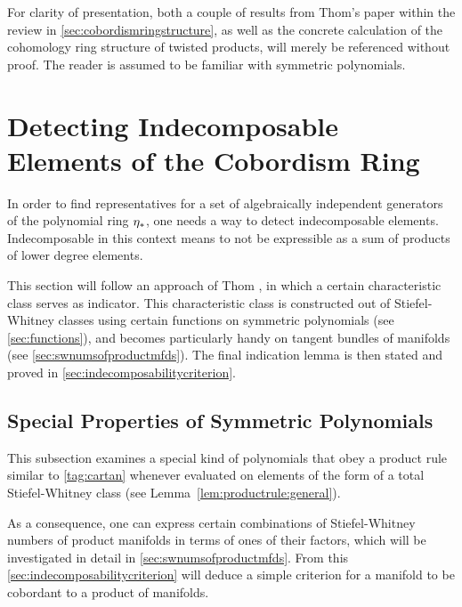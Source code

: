 For clarity of presentation, both a couple of results from Thom's
paper \cite{thom} within the review in
\autoref{sec:cobordismringstructure},
as well as the concrete calculation of the cohomology ring structure
of twisted products, will merely be referenced without proof.
The reader is assumed to be familiar with symmetric polynomials.

\section{Detecting Indecomposable Elements of the Cobordism Ring}
\label{sec:indecomposableelements}
In order to find representatives for a set of algebraically
independent generators of the polynomial ring $\eta_*$, one needs a way
to detect indecomposable elements. Indecomposable in this 
context means to not be expressible as a sum of products of lower
degree elements.

This section will follow an approach of Thom 
\cite[Chapters~IV.5 and~IV.6]{thom}, in which a certain characteristic
class serves as indicator. This characteristic class is constructed
out of Stiefel-Whitney classes using certain functions on symmetric
polynomials (see \autoref{sec:functions}), and becomes particularly
handy on tangent bundles of manifolds (see
\autoref{sec:swnumsofproductmfds}). The final indication lemma is then
stated and proved in \autoref{sec:indecomposabilitycriterion}.

\subsection{Special Properties of Symmetric Polynomials}\label{sec:functions}
This subsection examines a special kind of polynomials that
obey a product rule similar to \ref{tag:cartan} whenever evaluated on
elements of the form of a total Stiefel-Whitney class
(see Lemma~\ref{lem:productrule:general}).

As a consequence, one can express certain combinations of
Stiefel-Whitney numbers of product manifolds in terms of ones of their
factors, which will be investigated in detail in
\autoref{sec:swnumsofproductmfds}.
From this \autoref{sec:indecomposabilitycriterion} will deduce a
simple criterion for a manifold to be cobordant to a product of
manifolds.

